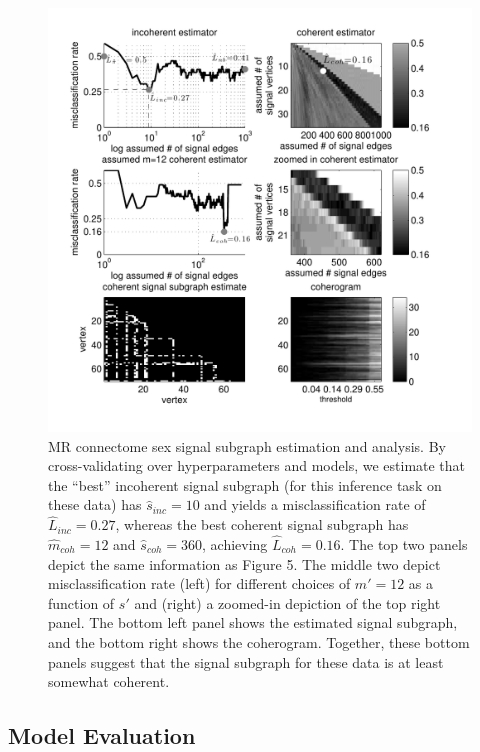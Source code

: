 \documentclass[10pt,journal,cspaper,compsoc]{IEEEtran}
\providecommand{\mh}[1]{\hat{#1}}
\begin{document}


\begin{figure}[htbp]
	\centering
		\includegraphics[width=1.0\linewidth]{../figs/BLSA0317_Count_Lhats_results.pdf}
	\caption{MR connectome sex signal subgraph estimation and analysis. By cross-validating over hyperparameters and models, we estimate that the ``best'' incoherent signal subgraph (for this inference task on these data) has $\mh{s}_{inc}=10$ and yields a misclassification rate of $\mh{L}_{inc}=0.27$, whereas the best coherent signal subgraph has $\mh{m}_{coh}=12$ and $\mh{s}_{coh}=360$, achieving $\mh{L}_{coh}=0.16$.  The top two panels depict the same information as Figure 5.  The middle two depict misclassification rate (left) for different choices of $m'=12$ as a function of $s'$ and (right) a zoomed-in depiction of the top right panel. The bottom left panel shows the estimated signal subgraph, and the bottom right shows the coherogram.  Together, these bottom panels suggest that the signal subgraph for these data is at least somewhat coherent.}
	\label{fig:data}
\end{figure}

\subsection{Model Evaluation} %
\label{sub:model_checking}
\end{document}
